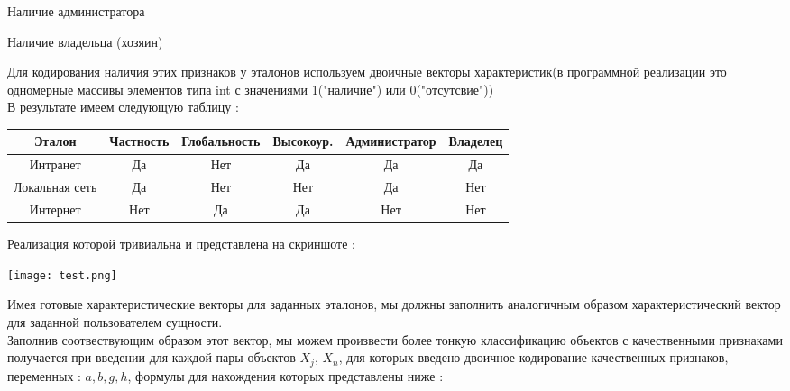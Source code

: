 \documentclass[a4paper,12pt]{article}
\begin{document}
\begin{flushleft}
\begin{list}{}{\leftmargin=3cm}
				\item Наличие администратора
				\item Наличие владельца (хозяин)
		\end{list}
		\medskip
		Для кодирования наличия этих признаков у эталонов используем 		двоичные векторы характеристик(в программной реализации это одномерные массивы элементов типа int с значениями 1("наличие") или 0("отсутсвие")) 
		\\
		\medskip
		В результате имеем следующую таблицу :
		\\
		\medskip
\begin{center}
		\begin{tabular}{|c|c|c|c|c|c|}
			\hline \textbf{Эталон} & \textbf{Частность} & 			\textbf{Глобальность} & \textbf{Высокоур.} & \textbf{Администратор} & 		\textbf{Владелец} \\ 
			\hline Интранет & Да & Нет & Да & Да & Да \\ 
			\hline Локальная сеть & Да & Нет & Нет & Да & Нет \\ 
			\hline Интернет & Нет & Да & Да & Нет & Нет \\ 
			\hline 
		\end{tabular}
		\end{center}
		\medskip
		Реализация которой тривиальна и представлена на скриншоте : 
		\begin{center}
			\texttt{[image: test.png]}
		\end{center} 
		Имея готовые характеристические векторы для заданных эталонов, мы должны заполнить аналогичным образом характеристический вектор для заданной пользователем сущности.\\Заполнив соотвествующим образом этот вектор, мы можем произвести более тонкую классификацию объектов с качественными признаками получается при введении для каждой пары объектов
		${X_j}$, ${X_n}$, для которых введено двоичное кодирование качественных признаков, переменных : ${a,b,g,h}$, формулы для нахождения которых представлены ниже :
				 

\end{flushleft}
\end{document}
